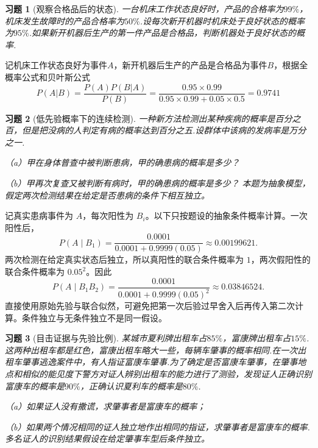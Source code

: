 \documentclass[12pt,fontset=fandol]{ctexart}
\newtheorem{exercise}{习题}[section]
\begin{document}
\begin{exercise}[观察合格品后的状态]\label{q:Y2.22}
一台机床工作状态良好时，产品的合格率为$99\%$，机床发生故障时的产品合格率为$50\%$.设每次新开机器时机床处于良好状态的概率为$95\%$.如果新开机器后生产的第一件产品是合格品，判断机器处于良好状态的概率.\par{}
\end{exercise}

\begin{solve}\label{a:Y2.22}
记机床工作状态良好为事件$A$，新开机器后生产的产品是合格品为事件$B$，根据全概率公式和贝叶斯公式
\[P(A|B) = \frac{{P(A)P(B|A)}}{{P(B)}} = \frac{{0.95 \times 0.99}}{{0.95 \times 0.99 + 0.05 \times 0.5}} = 0.9741\]
\end{solve}

\begin{exercise}[低先验概率下的连续检测]\label{q:Y2.23}
一种新方法检测出某种疾病的概率是百分之百，但是把没病的人判定有病的概率达到百分之五.设群体中该病的发病率是万分之一.

（a）甲在身体普查中被判断患病，甲的确患病的概率是多少？

（b）甲再次复查又被判断有病时，甲的确患病的概率是多少？ 本题为抽象模型，假定两次检测结果在给定是否患病的条件下相互独立。\par{}
\end{exercise}

\begin{solve}\label{a:Y2.23}记真实患病事件为 $A$，每次阳性为 $B_i$。以下只按题设的抽象条件概率计算。一次阳性后，\[P(A\mid B_1)=\frac{0.0001}{0.0001+0.9999(0.05)}\approx0.00199621.\]两次检测在给定真实状态后独立，所以真阳性的联合条件概率为 $1$，两次假阳性的联合条件概率为 $0.05^2$。因此\[P(A\mid B_1B_2)=\frac{0.0001}{0.0001+0.9999(0.05)^2}\approx0.03846524.\]直接使用原始先验与联合似然，可避免把第一次后验过早舍入后再传入第二次计算。条件独立与无条件独立不是同一假设。\end{solve}

\begin{exercise}[目击证据与先验比例]\label{q:Y2.25}
某城市夏利牌出租车占$85\%$，富康牌出租车占$15\%$.这两种出租车都是红色，富康出租车略大一些，每辆车肇事的概率相同.在一次出租车肇事逃逸案件中，有人指证富康车肇事.为了确定是否富康车肇事，在肇事地点和相似的能见度下警方对证人辨别出租车的能力进行了测验，发现证人正确识别富康车的概率是$90\%$，正确认识夏利车的概率是$80\%$.

（a）如果证人没有撒谎，求肇事者是富康车的概率；

（b）如果两个情况相同的证人独立地作出相同的指证，求肇事者是富康车的概率. 多名证人的识别结果假设在给定肇事车型后条件独立。\par{}
\end{exercise}
\end{document}
